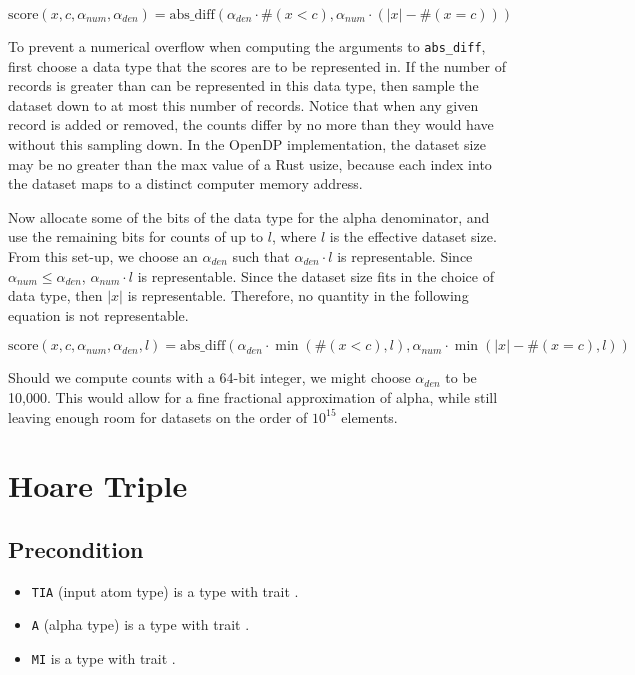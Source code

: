 \documentclass{article}
\begin{document}
\begin{equation}
    \textrm{score}(x, c, \alpha_{num}, \alpha_{den}) = \mathrm{abs\_diff}(\alpha_{den} \cdot \#(x < c), \alpha_{num} \cdot (|x| - \#(x = c)))
\end{equation}

To prevent a numerical overflow when computing the arguments to \texttt{abs\_diff},
first choose a data type that the scores are to be represented in.
If the number of records is greater than can be represented in this data type,
then sample the dataset down to at most this number of records.
Notice that when any given record is added or removed,
the counts differ by no more than they would have without this sampling down.
In the OpenDP implementation, the dataset size may be no greater than the max value of a Rust usize,
because each index into the dataset maps to a distinct computer memory address.

Now allocate some of the bits of the data type for the alpha denominator,
and use the remaining bits for counts of up to $l$, where $l$ is the effective dataset size.
From this set-up, we choose an $\alpha_{den}$ such that $\alpha_{den} \cdot l$ is representable.
Since $\alpha_{num} \le \alpha_{den}$, $\alpha_{num} \cdot l$ is representable.
Since the dataset size fits in the choice of data type, then $|x|$ is representable.
Therefore, no quantity in the following equation is not representable.

\begin{equation}
    \textrm{score}(x, c, \alpha_{num}, \alpha_{den}, l) = \mathrm{abs\_diff}(\alpha_{den} \cdot \min(\#(x < c), l), \alpha_{num} \cdot \min(|x| - \#(x = c), l))
\end{equation}

Should we compute counts with a 64-bit integer, we might choose $\alpha_{den}$ to be 10,000.
This would allow for a fine fractional approximation of alpha,
while still leaving enough room for datasets on the order of $10^{15}$ elements.

\section{Hoare Triple}
\subsection*{Precondition}
\begin{itemize}
    \item \texttt{TIA} (input atom type) is a type with trait .
    \item \texttt{A} (alpha type) is a type with trait .
    \item \texttt{MI} is a type with trait .
\end{itemize}
\end{document}
